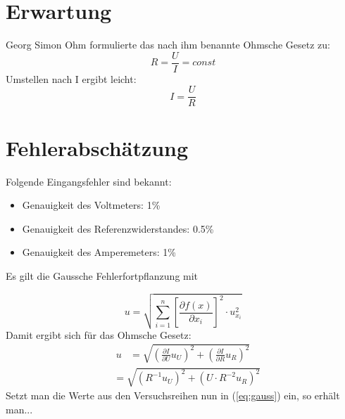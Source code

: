 \documentclass[a4paper,10pt]{article}
\begin{document}
\section{Erwartung}
Georg Simon Ohm formulierte das nach ihm benannte Ohmsche Gesetz zu:
 $$R = \frac{U}{I} = const$$
Umstellen nach I ergibt leicht:
 $$I = \frac{U}{R}$$

\section{Fehlerabschätzung}

Folgende Eingangsfehler sind bekannt:
\begin{itemize}
 \item Genauigkeit des Voltmeters: 1\%
 \item Genauigkeit des Referenzwiderstandes: 0.5\%
 \item Genauigkeit des Amperemeters: 1\%
\end{itemize}

Es gilt die Gaussche Fehlerfortpflanzung mit

\begin{equation}
 u = \sqrt{\sum_{i=1}^{n}\left[ \frac{\partial f(x)}{\partial x_i} \right]^2 \cdot u_{x_i}^2}
\end{equation}
Damit ergibt sich für das Ohmsche Gesetz: 
\begin{align}
 u &= \sqrt{\left( \frac{\partial I}{\partial U}u_U \right)^2 + \left( \frac{\partial I}{\partial R}u_R \right)^2}
\end{align}
\begin{align}
 &= \sqrt{\left(R^{-1}u_U\right)^2 + \left( U\cdot R^{-2}u_R \right)^2}
 \label{eq:gauss}
\end{align}
Setzt man die Werte aus den Versuchsreihen nun in (\ref{eq:gauss}) ein, so erhält man...
\end{document}
